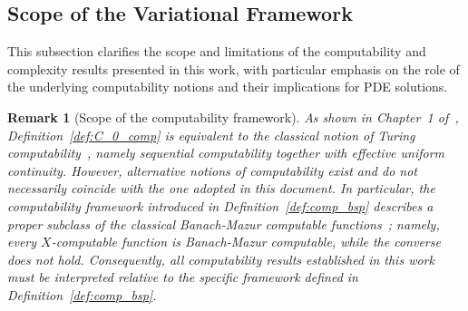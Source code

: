 \documentclass[pdflatex]{sn-jnl}%
\newtheorem{remark}[theorem]{Remark}
\begin{document}
\subsection{Scope of the Variational Framework}\label{subsec:Scope}
This subsection clarifies the scope and limitations of the computability and
complexity results presented in this work, with particular emphasis on the role
of the underlying computability notions and their implications for PDE
solutions.

\begin{remark}[Scope of the computability framework]
As shown in Chapter~1 of~\cite{Pour-El1989-yg}, Definition~\ref{def:C_0_comp} is
equivalent to the classical notion of Turing computability~\cite{Grzegorczyk1957},
namely sequential computability together with effective uniform continuity.
However, alternative notions of computability exist and do not necessarily
coincide with the one adopted in this document. In particular, the computability framework
introduced in Definition~\ref{def:comp_bsp} describes a proper subclass of the
classical Banach-Mazur computable functions~\cite{Boche2026-kq}; namely, 
every $X$-computable function is Banach-Mazur computable, while the converse does
not hold. Consequently, all computability results established in this work must
be interpreted relative to the specific framework defined in
Definition~\ref{def:comp_bsp}.
\end{remark}
\end{document}
